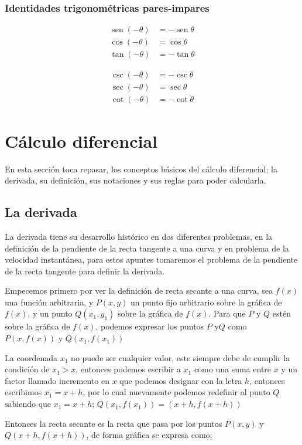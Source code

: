 \documentclass[11pt,letterpaper,oneside]{book}
\numberwithin{equation}{section}
\renewcommand{\sin}{\operatorname{sen}}
\begin{document}
\subsubsection{Identidades trigonométricas pares-impares}
	\begin{minipage}{0.48\textwidth}
		\begin{align}
			\sin (-\theta) &= -\sin \theta \\
			\cos (-\theta) &= \cos \theta \\
			\tan (-\theta) &= -\tan \theta
		\end{align}
	\end{minipage}
	\begin{minipage}{0.48\textwidth}
		\begin{align}
			\csc (-\theta) &= -\csc \theta \\
			\sec (-\theta) &= \sec \theta \\
			\cot (-\theta) &= -\cot \theta
		\end{align}
	\end{minipage}
	
	
	\section{Cálculo diferencial}
	
	\par En esta sección toca repasar, los conceptos básicos del cálculo diferencial; la derivada, su definición, sus notaciones y sus reglas para poder calcularla.
	\subsection{La derivada}
	\par La derivada tiene su desarrollo histórico en dos diferentes problemas, en la definición de la pendiente de la recta tangente a una curva y en problema de la velocidad instantánea, para estos apuntes tomaremos el problema de la pendiente de la recta tangente para definir la derivada.
	
	\par Empecemos primero por ver la definición de recta secante a una curva, sea $f(x)$ una función arbitraria, y $P(x,y)$ un punto fijo arbitrario sobre la gráfica de $f(x)$, y un punto $Q(x_1,y_1)$ sobre la gráfica de $f(x)$. Para que $P$ y $Q$ estén sobre la gráfica de $f(x)$, podemos expresar los puntos $P$ y$Q$ como $P(x,f(x))$ y $Q(x_1,f(x_1))$
	
	\par La coordenada $x_1$ no puede ser cualquier valor, este siempre debe de cumplir la condición de $x_1>x$, entonces podemos escribir a $x_1$ como una suma entre $x$ y un factor llamado incremento en $x$ que podemos designar con la letra $h$, entonces escribimos $x_1=x+h$, por lo cual nuevamente podemos redefinir al punto $Q$ sabiendo que $x_1=x+h$; $Q(x_1,f(x_1))=(x+h,f(x+h))$	
	\par Entonces la recta secante es la recta que pasa por los puntos $P(x,y)$ y $Q(x+h,f(x+h))$, de forma gráfica se expresa como;
	
\end{document}
